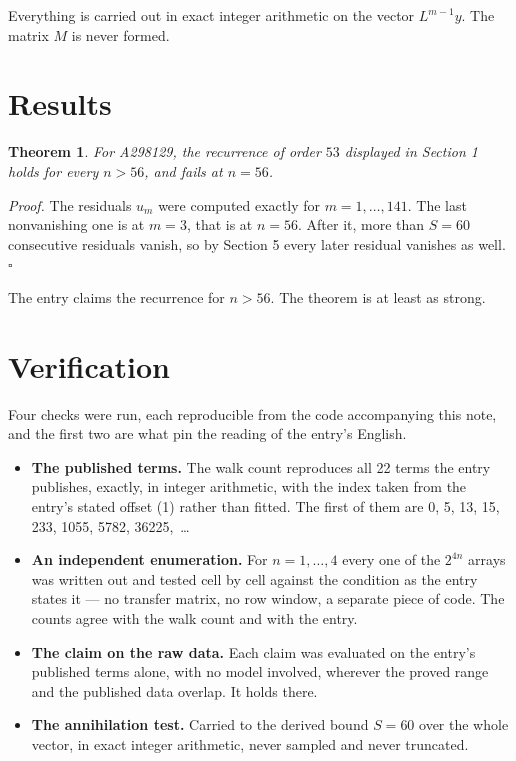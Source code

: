 \documentclass[11pt]{article}
\newtheorem{theorem}{Theorem}
\theoremstyle{definition}
\begin{document}
Everything is carried out in exact integer arithmetic on the vector $L^{m-1}y$. The matrix $M$ is never formed.

\section{Results}

\begin{theorem} For A298129, the recurrence of order $53$ displayed in Section 1 holds for every $n > 56$, and fails at $n = 56$.\end{theorem}

{\itshape Proof.} The residuals $u_m$ were computed exactly for $m = 1,\dots,141$. The last nonvanishing one is at $m = 3$, that is at $n = 56$. After it, more than $S = 60$ consecutive residuals vanish, so by Section 5 every later residual vanishes as well. $\square$

The entry claims the recurrence for $n > 56$. The theorem is at least as strong.

\section{Verification}

Four checks were run, each reproducible from the code accompanying this note, and the first two are what pin the reading of the entry's English.

\begin{itemize}

\item {\bfseries The published terms.} The walk count reproduces all 22 terms the entry publishes, exactly, in integer arithmetic, with the index taken from the entry's stated offset (1) rather than fitted. The first of them are 0, 5, 13, 15, 233, 1055, 5782, 36225,~\dots

\item {\bfseries An independent enumeration.} For $n = 1,\dots,4$ every one of the $2^{4n}$ arrays was written out and tested cell by cell against the condition as the entry states it --- no transfer matrix, no row window, a separate piece of code. The counts agree with the walk count and with the entry.

\item {\bfseries The claim on the raw data.} Each claim was evaluated on the entry's published terms alone, with no model involved, wherever the proved range and the published data overlap. It holds there.

\item {\bfseries The annihilation test.} Carried to the derived bound $S = 60$ over the whole vector, in exact integer arithmetic, never sampled and never truncated.

\end{itemize}
\end{document}

